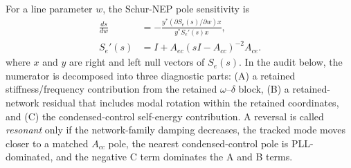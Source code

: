 \documentclass[journal]{IEEEtran}
\begin{document}
For a line parameter $w$, the Schur-NEP pole sensitivity is
\begin{align}
\frac{ds}{dw}
&=-\frac{y^\ast(\partial S_e(s)/\partial w)x}
{y^\ast S_e'(s)x}, \nonumber\\
S_e'(s)
&=I+A_{ec}(sI-A_{cc})^{-2}A_{ce}.
\label{eq:schursens}
\end{align}
where $x$ and $y$ are right and left null vectors of $S_e(s)$. In the audit below, the numerator is decomposed into three diagnostic parts: (A) a retained stiffness/frequency contribution from the retained $\omega$--$\delta$ block, (B) a retained-network residual that includes modal rotation within the retained coordinates, and (C) the condensed-control self-energy contribution. A reversal is called \emph{resonant} only if the network-family damping decreases, the tracked mode moves closer to a matched $A_{cc}$ pole, the nearest condensed-control pole is PLL-dominated, and the negative C term dominates the A and B terms.
\end{document}
